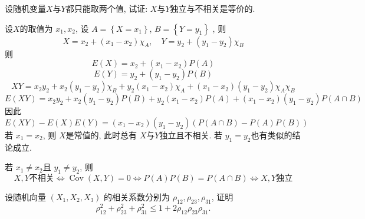 \documentclass[../main.tex]{subfiles}
\begin{document}
\begin{exercise}{}{}
设随机变量\(X\)与\(Y\)都只能取两个值, 试证: \(X\)与\(Y\)独立与不相关是等价的.
\end{exercise}

\begin{solution}
  设\(  X  \)的取值为 \(  x_1,x_2  \), 设 \(  A= \left\{ X= x_1 \right\}  \), \(  B= \left\{ Y= y_1 \right\}  \)  , 则 \[
  X= x_2+ \left( x_1-x_2 \right)\chi _{A}  ,\quad Y= y_2+ \left( y_1-y_2 \right)\chi _{B} 
  \]则 \[
  E\left( X \right)=x_2+ \left( x_1-x_2 \right)P\left( A \right)  
  \] \[
  E\left( Y \right)= y_2+ \left( y_1-y_2 \right)P\left( B \right)  
  \] \[
  XY= x_2y_2+ x_2\left( y_1-y_2 \right)\chi _{B}+ y_2\left( x_1-x_2 \right)\chi _{A}+ \left( x_1-x_2 \right)\left( y_1-y_2 \right)\chi _{A}\chi _{B}    
  \] \[
  E\left( XY \right)= x_2y_2+ x_2\left( y_1-y_2 \right)P\left( B \right)+ y_2\left( x_1-x_2 \right)P\left( A \right)+ \left( x_1-x_2 \right)\left( y_1-y_2 \right)P\left( A\cap B \right)        
  \]因此 \[
  E\left( XY \right)-E\left( X \right)E\left( Y \right)= \left( x_1-x_2 \right)\left( y_1-y_2 \right)\left(P\left( A\cap B \right)  - P\left( A \right)P\left( B \right)\right)      
  \]若 \( x_1= x_2  \), 则 \(  X  \)是常值的, 此时总有 \(  X  \)与\(  Y  \)独立且不相关. 若 \(  y_1= y_2  \)也有类似的结论成立.
  
  若 \(  x_1\neq x_2  \)且 \(  y_1\neq y_2  \), 则 \[
  X,Y\text{不相关}\iff \operatorname{Cov}\left( X,Y \right)= 0\iff P\left( A \right)P\left( B \right)= P\left( A\cap B \right)    \iff X,Y\text{独立}
  \]   
\end{solution}


\begin{exercise}{}{}
设随机向量 $(X_1, X_2, X_3)$ 的相关系数分别为 $\rho_{12}, \rho_{23}, \rho_{31}$, 证明
\[
\rho_{12}^2 + \rho_{23}^2 + \rho_{31}^2 \leqslant 1 + 2\rho_{12}\rho_{23}\rho_{31}.
\]
\end{exercise}
\end{document}
